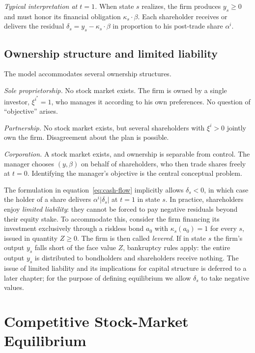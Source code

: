 \documentclass[11pt,a4paper,oneside]{book}
\def\geq{\geqslant}
\theoremstyle{plain}
\theoremstyle{definition}
\theoremstyle{remark}
\numberwithin{equation}{chapter}
\begin{document}
\emph{Typical interpretation at $t=1$.}
When state $s$ realizes, the firm produces $y_s \geq 0$ and must honor its financial obligation $\kappa_s \cdot \beta$.
Each shareholder receives or delivers the residual $\delta_s = y_s - \kappa_s \cdot \beta$ in proportion to his post-trade share $\alpha^i$.

\subsection{Ownership structure and limited liability}

The model accommodates several ownership structures.

\emph{Sole proprietorship.}
No stock market exists.
The firm is owned by a single investor, $\xi^{i^\ast} = 1$, who manages it according to his own preferences.
No question of ``objective'' arises.

\emph{Partnership.}
No stock market exists, but several shareholders with $\xi^i > 0$ jointly own the firm.
Disagreement about the plan is possible.

\emph{Corporation.}
A stock market exists, and ownership is separable from control.
The manager chooses $(y, \beta)$ on behalf of shareholders, who then trade shares freely at $t=0$.
Identifying the manager's objective is the central conceptual problem.

The formulation in equation~\eqref{eq:cash-flow} implicitly allows $\delta_s < 0$, in which case the holder of a share delivers $\alpha^i |\delta_s|$ at $t=1$ in state $s$.
In practice, shareholders enjoy \emph{limited liability}: they cannot be forced to pay negative residuals beyond their equity stake.
To accommodate this, consider the firm financing its investment exclusively through a riskless bond $a_0$ with $\kappa_s(a_0) = 1$ for every $s$, issued in quantity $Z \geq 0$.
The firm is then called \emph{levered}.
If in state $s$ the firm's output $y_s$ falls short of the face value $Z$, bankruptcy rules apply: the entire output $y_s$ is distributed to bondholders and shareholders receive nothing.
The issue of limited liability and its implications for capital structure is deferred to a later chapter; for the purpose of defining equilibrium we allow $\delta_s$ to take negative values.

\section{Competitive Stock-Market Equilibrium}
\label{sec:equilibrium}
\end{document}
